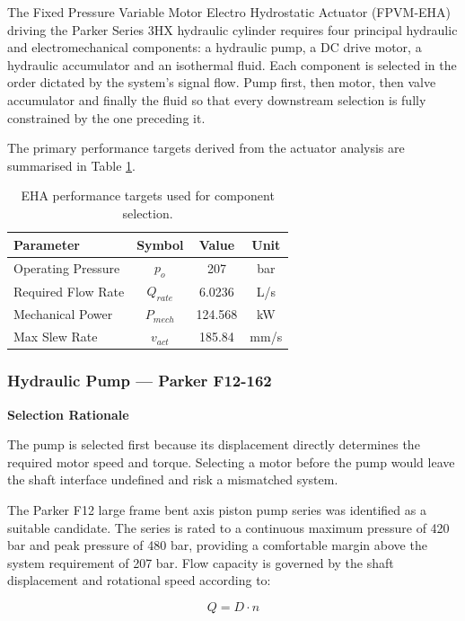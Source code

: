 \documentclass[
bindingoffset=5mm,  %
footnoteindent=3mm, %
hyphenation=true    %
]{src/wut-thesis}
\begin{document}
	The Fixed Pressure Variable Motor Electro Hydrostatic Actuator (FPVM-EHA) driving the Parker Series 3HX hydraulic cylinder requires four principal hydraulic and electromechanical components: a hydraulic pump, a DC drive motor, a hydraulic accumulator and an isothermal fluid. Each component is selected in the order dictated by the system's signal flow. Pump first, then motor, then valve accumulator and finally the fluid so that every downstream selection is fully constrained by the one preceding it.
	
	The primary performance targets derived from the actuator analysis are summarised in Table \ref{table:eha_targets}.
	
	\begin{table}[htbp]
		\centering
		\begin{tabular}{l c c c}
			\toprule
			Parameter &Symbol & Value  &Unit \\
			\midrule
			Operating Pressure & $p_{o}$ & 207 & bar \\
			Required Flow Rate & $Q_{rate}$ & 6.0236 & L/s \\
			Mechanical Power & $P_{mech}$ & 124.568 & kW \\
			Max Slew Rate & $v_{act}$ & 185.84 & mm/s \\
			\bottomrule
		\end{tabular}
		\caption{EHA performance targets used for component selection.}
		\label{table:eha_targets}
	\end{table}
	
	\subsubsection{Hydraulic Pump — Parker F12-162}
	
	\textbf{Selection Rationale}
	
	The pump is selected first because its displacement directly determines the required motor speed and torque. Selecting a motor before the pump would leave the shaft interface undefined and risk a mismatched system.
	
	The Parker F12 large frame bent axis piston pump series was identified as a suitable candidate. The series is rated to a continuous maximum pressure of 420 bar and peak pressure of 480 bar, providing a comfortable margin above the system requirement of 207 bar.\cite{parker_f11_f12} Flow capacity is governed by the shaft displacement and rotational speed according to:
	
	\begin{equation}
		Q = D \cdot n
	\end{equation}
	
\end{document}
